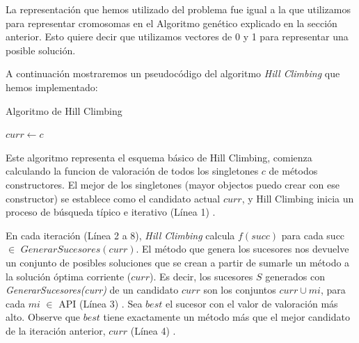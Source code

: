 La representación que hemos utilizado del problema fue igual a la que utilizamos para representar cromosomas en el Algoritmo genético explicado en la sección anterior. Esto quiere decir que utilizamos vectores de 0 y 1 para representar una posible solución. 

A continuación mostraremos un pseudocódigo del algoritmo \emph{Hill Climbing} que hemos implementado:

\begin{algorithm}[H]
  \caption{Algoritmo de Hill Climbing}
  \label{algo:hill_climbing}
  \SetAlgoLined
  $curr \gets c$\; 
  
  \;
\end{algorithm}

Este algoritmo representa el esquema básico de Hill Climbing, comienza
calculando la funcion de valoración de todos los singletones ${c}$ de métodos
constructores.  El mejor de los singletones (mayor objectos puedo crear con ese
constructor) se establece como el candidato actual $curr$, y Hill Climbing
inicia un proceso de búsqueda típico e iterativo (Línea 1) .

En cada iteración (Línea 2 a 8), \emph{Hill Climbing} calcula $f(succ)$ para
cada succ $\in$ $GenerarSucesores(curr)$. El método que genera los sucesores nos
devuelve un conjunto de posibles soluciones que se crean a partir de sumarle un
método a la solución óptima corriente ($curr$). Es decir, los sucesores  $S$
generados con \emph{GenerarSucesores(curr)} de un candidato $curr$ son los
conjuntos {$curr\cup{mi}$}, para cada $mi$ $\in$ API (Línea 3) .
Sea $best$ el sucesor con el valor de valoración más alto. Observe que $best$
tiene exactamente un método más que el mejor candidato de la iteración anterior,
$curr$ (Línea 4) .


